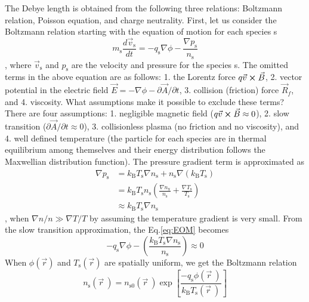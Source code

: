 The Debye length is obtained from the following three relations: Boltzmann relation, Poisson equation, and charge neutrality. First, let us consider the Boltzmann relation starting with the equation of motion for each species s
\begin{equation}
m_\text{s} \frac{d \vec{v}_\text{s}}{d t} = -q_\text{s} \nabla \phi - \frac{\nabla  p_\text{s}}{n_\text{s}}
\label{eq:EOM}
\end{equation}
, where $\vec{v}_\text{s}$ and $p_\text{s}$ are the velocity and pressure for the species s. The omitted terms in the above equation are as follows: 1. the Lorentz force $q \vec{v} \cross \vec{B}$, 2. vector potential in the electric field $\vec{E} = -\nabla \phi - \partial \vec{A} / \partial t$, 3. collision (friction) force $\vec{R}_f$, and 4. viscosity. What assumptions make it possible to exclude these terms? There are four assumptions: 1. negligible magnetic field ($q \vec{v} \cross \vec{B} \approx 0$), 2. slow transition ($\partial \vec{A} / \partial t \approx 0$), 3. collisionless plasma (no friction and no viscosity), and 4. well defined temperature (the particle for each species are in thermal equilibrium among themselves and their energy distribution follows the Maxwellian distribution function). The pressure gradient term is approximated as 
\begin{equation}
\begin{aligned}
\nabla p_\text{s} &= k_\text{B} T_\text{s} \nabla n_\text{s} + n_\text{s} \nabla \left( k_\text{B} T_\text{s} \right) \\
&= k_\text{B} T_\text{s} n_\text{s} \left( \frac{\nabla n_\text{x}}{n_\text{s}} + \frac{\nabla T_\text{s}}{T_\text{s}} \right) \\
&\approx k_\text{B} T_\text{s} \nabla n_\text{s}
\end{aligned}
\end{equation}
, when $\nabla n/n \gg \nabla T/T$ by assuming the temperature gradient is very small. From the slow transition approximation, the Eq.\ref{eq:EOM} becomes
\begin{equation}
- q_\text{s} \nabla \phi - \left( \frac{k_\text{B} T_\text{s} \nabla n_\text{s}}{n_\text{s}} \right) \approx 0
\end{equation}
When $\phi \left( \vec{r} \right)$ and $T_\text{s} \left( \vec{r} \right)$ are spatially uniform, we get the Boltzmann relation
\begin{equation}
n_\text{s} \left(\vec{r} ~\right) = n_\text{s0} \left( \vec{r} ~\right) \exp \left[ \frac{-q_\text{s} \phi \left( \vec{r} ~\right)}{k_\text{B} T_\text{s} \left( \vec{r} ~\right) }\right]
\label{eq:BoltzmannRelation}
\end{equation}
